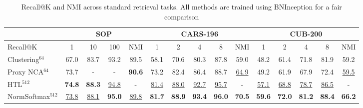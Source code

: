 \documentclass{bmvc2k}
\begin{document}
\begin{table*}
\begin{center}
{\begin{tabular}{l | c c c c  | c c c c c | c c c c c }
\hline
 &  \multicolumn{4}{c}{SOP} &  \multicolumn{5}{c}{CARS-196} &  \multicolumn{5}{c}{CUB-200} \\
\hline
Recall@K &  1 & 10 & 100  & NMI & 1 & 2 & 4 & 8 & NMI & 1 & 2 &4 & 8 & NMI \\
\hline\hline
Clustering$^{64}$~\cite{songCVPR17}  & 67.0 & 83.7& 93.2 & 89.5 & 58.1 & 70.6 & 80.3 & 87.8 &  59.0 & 48.2 & 61.4 & 71.8 & 81.9 & 59.2 \\
Proxy NCA$^{64}$\cite{nofusslearning}  &  73.7 & - & - & \textbf{90.6} & 73.2 & 82.4 & 86.4 & 88.7 & \underline{64.9} & 49.2 & 61.9 & 67.9 & 72.4 & \underline{59.5} \\
HTL$^{512}$~\cite{htl}  &  \textbf{74.8} & \textbf{88.3} & \underline{94.8} & - & \underline{81.4} & \underline{88.0} & \underline{92.7} & \underline{95.7} & - & \underline{57.1} & \underline{68.8} & \underline{78.7} & \underline{86.5} & - \\ 
\hline
NormSoftmax$^{512}$  & \underline{73.8} & \underline{88.1} & \textbf{95.0} & \underline{89.8} & \textbf{81.7} & \textbf{88.9} & \textbf{93.4} & \textbf{96.0} & \textbf{70.5} & \textbf{59.6} & \textbf{72.0} & \textbf{81.2} & \textbf{88.4} & \textbf{66.2} \\

\end{tabular}
}
\caption{Recall@K and NMI across standard retrieval tasks. All methods are trained using BNInception for a fair comparison}
\label{tab:bninception_loss}
\bigskip

\resizebox{0.9\linewidth}{!}{

}
\end{center}
\end{table*}
\end{document}
